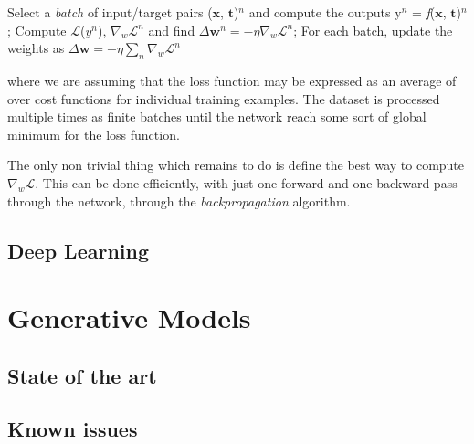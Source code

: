 \begin{outline}[enumerate]
    \1 Select a \emph{batch} of input/target pairs ($\mathbf{x}$, $\mathbf{t}$)$^n$ and compute the outputs y$^n$ = \emph{f}($\mathbf{x}$, $\mathbf{t}$)$^n$;
    \1 Compute $\mathcal{L}$($y^n$), $\nabla_w \mathcal{L}^n$ and find $ \Delta \mathbf{w}^n = - \eta \nabla_w \mathcal{L}^n$;
    \1 For each batch, update the weights as $ \Delta \mathbf{w} = - \eta \sum_n \nabla_w \mathcal{L}^n$
\end{outline}

where we are assuming that the loss function may be expressed as an average of over cost functions for individual training examples. The dataset is processed multiple times as finite batches until the network reach some sort of global minimum for the loss function.

The only non trivial thing which remains to do is define the best way to compute $\nabla_w \mathcal{L}$. This can be done efficiently, with just one forward and one backward pass through the network, through the \emph{backpropagation} algorithm.


\subsection{Deep Learning}
\section{Generative Models}

\subsection{State of the art}

\subsection{Known issues}

